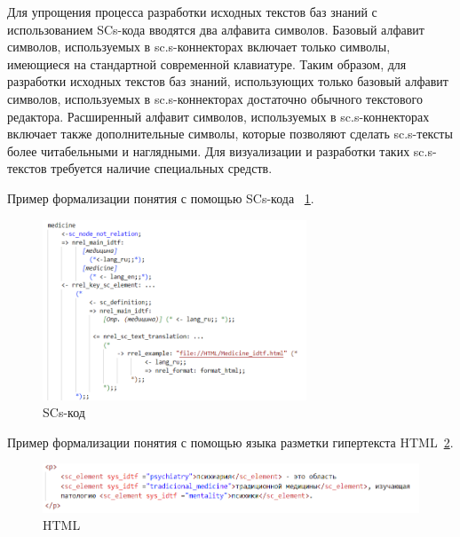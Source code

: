 Для упрощения процесса разработки исходных текстов баз знаний с использованием SCs-кода вводятся два алфавита символов. Базовый алфавит символов, используемых в sc.s-коннекторах включает только символы, имеющиеся на стандартной современной клавиатуре. Таким образом, для разработки исходных текстов баз знаний, использующих только базовый алфавит символов, используемых в sc.s-коннекторах достаточно обычного текстового редактора. Расширенный алфавит символов, используемых в sc.s-коннекторах включает также дополнительные символы, которые позволяют сделать sc.s-тексты более читабельными и наглядными. Для визуализации и разработки таких sc.s-текстов требуется наличие специальных средств.

Пример формализации понятия с помощью SCs-кода ~\ref{fig:sections/SCs}.
\begin{figure}[H]
	\centering
	\includegraphics[width=0.7\textwidth]{sections/scs_medicine.png}
	\caption{SCs-код}
	\label{fig:sections/SCs}
\end{figure}

Пример формализации понятия с помощью языка разметки гипертекста HTML~\ref{fig:sections/HTML}.
\begin{figure}[H]
	\centering
	\includegraphics[width=1.0\textwidth]{sections/html_psychiatry.png}
	\caption{HTML}
	\label{fig:sections/HTML}
\end{figure}

